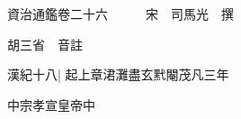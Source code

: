 






























































資治通鑑卷二十六　　　宋　司馬光　撰

胡三省　音註

漢紀十八|{
	起上章涒灘盡玄黓閹茂凡三年}


中宗孝宣皇帝中

